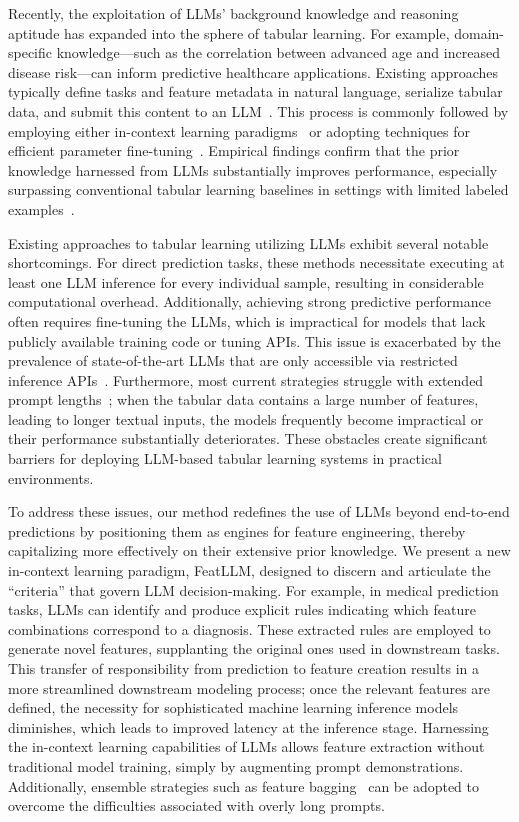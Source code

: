 Recently, the exploitation of LLMs’ background knowledge and reasoning aptitude has expanded into the sphere of tabular learning. For example, domain-specific knowledge—such as the correlation between advanced age and increased disease risk—can inform predictive healthcare applications. Existing approaches typically define tasks and feature metadata in natural language, serialize tabular data, and submit this content to an LLM~\cite{dinh2022lift,wang2023anypredict}. This process is commonly followed by employing either in-context learning paradigms~\cite{nam2023semi} or adopting techniques for efficient parameter fine-tuning~\cite{dinh2022lift,hegselmann2023tabllm}. Empirical findings confirm that the prior knowledge harnessed from LLMs substantially improves performance, especially surpassing conventional tabular learning baselines in settings with limited labeled examples~\cite{hegselmann2023tabllm}.

Existing approaches to tabular learning utilizing LLMs exhibit several notable shortcomings. For direct prediction tasks, these methods necessitate executing at least one LLM inference for every individual sample, resulting in considerable computational overhead. Additionally, achieving strong predictive performance often requires fine-tuning the LLMs, which is impractical for models that lack publicly available training code or tuning APIs. This issue is exacerbated by the prevalence of state-of-the-art LLMs that are only accessible via restricted inference APIs~\cite{anil2023palm,openai2023gpt4}. Furthermore, most current strategies struggle with extended prompt lengths~\cite{liu2023lost}; when the tabular data contains a large number of features, leading to longer textual inputs, the models frequently become impractical or their performance substantially deteriorates. These obstacles create significant barriers for deploying LLM-based tabular learning systems in practical environments.

To address these issues, our method redefines the use of LLMs beyond end-to-end predictions by positioning them as engines for feature engineering, thereby capitalizing more effectively on their extensive prior knowledge. We present a new in-context learning paradigm, \textsf{FeatLLM}, designed to discern and articulate the ``criteria'' that govern LLM decision-making. For example, in medical prediction tasks, LLMs can identify and produce explicit rules indicating which feature combinations correspond to a diagnosis. These extracted rules are employed to generate novel features, supplanting the original ones used in downstream tasks. This transfer of responsibility from prediction to feature creation results in a more streamlined downstream modeling process; once the relevant features are defined, the necessity for sophisticated machine learning inference models diminishes, which leads to improved latency at the inference stage. Harnessing the in-context learning capabilities of LLMs allows feature extraction without traditional model training, simply by augmenting prompt demonstrations. Additionally, ensemble strategies such as feature bagging~\cite{breiman2001random} can be adopted to overcome the difficulties associated with overly long prompts.

